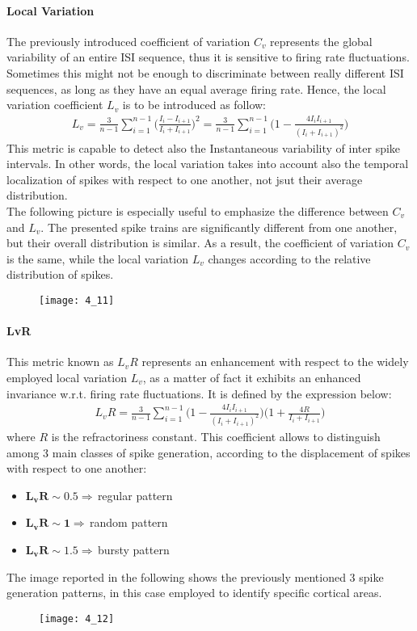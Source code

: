 \paragraph{Local Variation}
The previously introduced coefficient of variation \(C_v\) represents the global
variability of an entire ISI sequence, thus it is sensitive to firing rate
fluctuations. Sometimes this might not be enough to discriminate between really
different ISI sequences, as long as they have an equal average firing rate. Hence,
the local variation coefficient \(L_v\) is to be introduced as follow:
\begin{align*}
    L_v
    =\frac{3}{n-1}\sum_{i=1}^{n-1}\biggl(\frac{I_{i}-I_{i+1}}{I_{i}+I_{i+1}}\biggr)^2
    =\frac{3}{n-1}\sum_{i=1}^{n-1}\biggl(1-\frac{4I_{i}I_{i+1}}{(I_{i}+I_{i+1})^2}\biggr)
\end{align*}
This metric is capable to detect also the Instantaneous variability of inter spike
intervals. In other words, the local variation takes into account also the
temporal localization of spikes with respect to one another, not jsut their
average distribution.\\
The following picture is especially useful to emphasize the difference between
\(C_v\) and \(L_v\). The presented spike trains are significantly different from
one another, but their overall distribution is similar. As a result, the
coefficient of variation \(C_v\) is the same, while the local variation \(L_v\)
changes according to the relative distribution of spikes.
\begin{figure}[H]
    \texttt{[image: 4\_11]}
    \centering
\end{figure}

\paragraph{LvR}
This metric known as \(L_{v}R\) represents an enhancement with respect to the widely
employed local variation \(L_v\), as a matter of fact it exhibits an enhanced
invariance w.r.t. firing rate fluctuations. It is defined by the expression below:
\begin{align*}
    L_{v}R
    =\frac{3}{n-1}\sum_{i=1}^{n-1}\biggl(1-\frac{4I_{i}I_{i+1}}{(I_{i}+I_{i+1})^2}\biggr)\biggl(1+\frac{4R}{I_{i}+I_{i+1}}\biggr)
\end{align*}
where \(R\) is the refractoriness constant.
This coefficient allows to distinguish among 3 main classes of spike generation,
according to the displacement of spikes with respect to one another:
\begin{itemize}
    \item \(\mathbf{L_{v}R\sim0.5}\Rightarrow\,\)regular pattern
    \item \(\mathbf{L_{v}R\sim1}\Rightarrow\,\)random pattern
    \item \(\mathbf{L_{v}R\sim1.5}\Rightarrow\,\)bursty pattern
\end{itemize}
The image reported in the following shows the previously mentioned 3 spike generation
patterns, in this case employed to identify specific cortical areas.
\begin{figure}[H]
    \texttt{[image: 4\_12]}
    \centering
\end{figure}